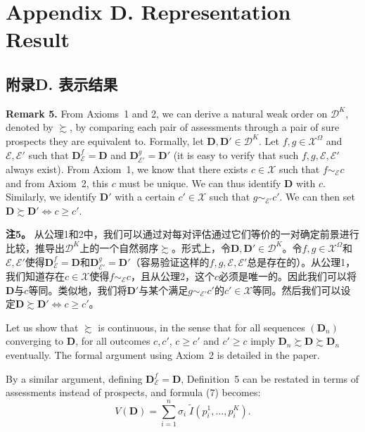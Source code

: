 \documentclass[12pt,a4paper]{article}
\newenvironment{original}
  {\par\noindent\ignorespaces}
  {\par}
\newenvironment{translation}
  {\par\noindent{\color{transblue}\ignorespaces}}
  {\par\medskip}
\begin{document}
\newpage
\section*{Appendix D. Representation Result}
{\color{transblue}\subsection*{附录D. 表示结果}}

\begin{original}
\textbf{Remark 5.} From Axioms~1 and 2, we can derive a natural weak order on $\mathcal{D}^{K}$, denoted by $\succsim$, by comparing each pair of assessments through a pair of sure prospects they are equivalent to. Formally, let $\mathbf{D}, \mathbf{D}' \in \mathcal{D}^{K}$. Let $f, g \in \mathcal{X}^{\Omega}$ and $\mathcal{E}, \mathcal{E}'$ such that $\mathbf{D}_{\mathcal{E}}^{f} = \mathbf{D}$ and $\mathbf{D}_{\mathcal{E}'}^{g} = \mathbf{D}'$ (it is easy to verify that such $f, g, \mathcal{E}, \mathcal{E}'$ always exist). From Axiom~1, we know that there exists $c \in \mathcal{X}$ such that $f \sim_{\mathcal{E}} c$ and from Axiom~2, this $c$ must be unique. We can thus identify $\mathbf{D}$ with $c$. Similarly, we identify $\mathbf{D}'$ with a certain $c' \in \mathcal{X}$ such that $g \sim_{\mathcal{E}'} c'$. We can then set $\mathbf{D} \succsim \mathbf{D}' \iff c \geq c'$.
\end{original}

\begin{translation}
\textbf{注5。} 从公理1和2中，我们可以通过对每对评估通过它们等价的一对确定前景进行比较，推导出$\mathcal{D}^{K}$上的一个自然弱序$\succsim$。形式上，令$\mathbf{D}, \mathbf{D}' \in \mathcal{D}^{K}$。令$f, g \in \mathcal{X}^{\Omega}$和$\mathcal{E}, \mathcal{E}'$使得$\mathbf{D}_{\mathcal{E}}^{f} = \mathbf{D}$和$\mathbf{D}_{\mathcal{E}'}^{g} = \mathbf{D}'$（容易验证这样的$f, g, \mathcal{E}, \mathcal{E}'$总是存在的）。从公理1，我们知道存在$c \in \mathcal{X}$使得$f \sim_{\mathcal{E}} c$，且从公理2，这个$c$必须是唯一的。因此我们可以将$\mathbf{D}$与$c$等同。类似地，我们将$\mathbf{D}'$与某个满足$g \sim_{\mathcal{E}'} c'$的$c' \in \mathcal{X}$等同。然后我们可以设定$\mathbf{D} \succsim \mathbf{D}' \iff c \geq c'$。
\end{translation}

\begin{original}
Let us show that $\succsim$ is continuous, in the sense that for all sequences $(\mathbf{D}_{n})$ converging to $\mathbf{D}$, for all outcomes $c, c'$, $c \geq c'$ and $c' \geq c$ imply $\mathbf{D}_{n} \succsim \mathbf{D} \succsim \mathbf{D}_{n}$ eventually. The formal argument using Axiom~2 is detailed in the paper.

By a similar argument, defining $\mathbf{D}_{\mathcal{E}}^{f} = \mathbf{D}$, Definition~5 can be restated in terms of assessments instead of prospects, and formula (7) becomes:
\[
V(\mathbf{D}) = \sum_{i=1}^{n} \sigma_{i} \; \tilde{I}(p^{1}_{i}, \dots, p^{K}_{i}). \tag{D.1}
\]
\end{original}
\end{document}
